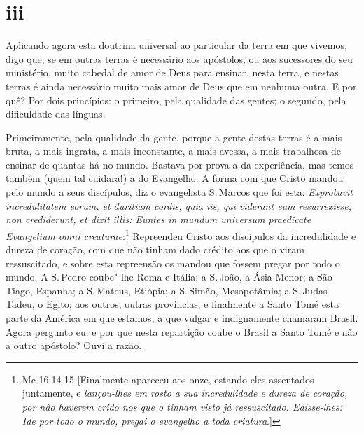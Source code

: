 \section*{iii}

Aplicando agora esta doutrina universal ao particular da terra em que
vivemos, digo que, se em outras terras é necessário aos apóstolos, ou
aos sucessores do seu ministério, muito cabedal de amor de Deus para
ensinar, nesta terra, e nestas terras é ainda necessário muito mais amor
de Deus que em nenhuma outra. E por quê? Por dois princípios: o
primeiro, pela qualidade das gentes; o segundo, pela dificuldade das
línguas.

Primeiramente, pela qualidade da gente, porque a gente destas terras é a
mais bruta, a mais ingrata, a mais inconstante, a mais avessa, a mais
trabalhosa de ensinar de quantas há no mundo. Bastava por prova a da
experiência, mas temos também (quem tal cuidara!) a do Evangelho.
A forma com que Cristo mandou pelo mundo a seus discípulos, diz o
evangelista S.\,Marcos que foi esta: \emph{Exprobavit incredulitatem
eorum, et duritiam cordis, quia iis, qui viderant eum resurrexisse, non
crediderunt, et dixit illis: Euntes in mundum universum praedicate
Evangelium omni creaturae}:\footnote{Mc 16:14-15 [Finalmente apareceu aos onze, estando eles assentados juntamente, e \emph{lançou-lhes em rosto a sua incredulidade e dureza de coração, por não haverem crido nos que o tinham visto já ressuscitado. Edisse-lhes: Ide por todo o mundo, pregai o evangelho a toda criatura}.]} Repreendeu Cristo aos
discípulos da incredulidade e dureza de coração, com que não tinham dado
crédito aos que o viram ressuscitado, e sobre esta repreensão os mandou
que fossem pregar por todo o mundo. A S.\,Pedro coube"-lhe Roma e
Itália; a S.\,João, a Ásia Menor; a São Tiago, Espanha; a S.\,Mateus,
Etiópia; a S.\,Simão, Mesopotâmia; a S.\,Judas Tadeu, o Egito; aos outros,
outras províncias, e finalmente a Santo Tomé esta parte da América em
que estamos, a que vulgar e indignamente chamaram Brasil. Agora pergunto
eu: e por que nesta repartição coube o Brasil a Santo Tomé e não a outro
apóstolo? Ouvi a razão.

